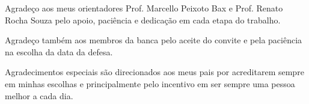 \documentclass[
	12pt,               %
	openright,          %
	oneside,            %
	a4paper,            %
	english,            %
	brazil              %
	]{abntex2}
\begin{document}
\begin{agradecimentos}

Agradeço aos meus orientadores Prof. Marcello Peixoto Bax e Prof. Renato Rocha Souza pelo apoio, paciência e dedicação em cada etapa do trabalho.

Agradeço também aos membros da banca pelo aceite do convite e pela paciência na escolha da data da defesa.

Agradecimentos especiais são direcionados aos meus pais por acreditarem sempre em minhas escolhas e principalmente pelo incentivo em ser sempre uma pessoa melhor a cada dia.

\end{agradecimentos}





\listoffigures*
\cleardoublepage

\listoftables*
\cleardoublepage



\end{document}
